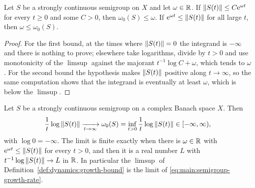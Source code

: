 \begin{lemma}
  \label{lem:dynamics:growth-bound-norm-bounds}
  \leanok
  Let $S $ be a strongly continuous semigroup on $X $ and let $\omega\in\mathbb{R} $.  If
  $\left\|S(t)\right\|\leq C\mathrm{e}^{\omega t} $ for every $t\geq0 $ and some $C>0 $, then
  $\omega_0(S)\leq\omega $.  If $\mathrm{e}^{\omega t}\leq\left\|S(t)\right\| $ for all large $t $, then
  $\omega\leq\omega_0(S) $.
\end{lemma}

\begin{proof}
  \leanok
  For the first bound, at the times where $\left\|S(t)\right\|=0 $ the integrand is $-\infty $ and
  there is nothing to prove; elsewhere take logarithms, divide by $t>0 $ and use
  monotonicity of the $\limsup $ against the majorant $t^{-1}\log C+\omega $, which tends
  to $\omega $.  For the second bound the hypothesis makes $\left\|S(t)\right\| $ positive along
  $t\to\infty $, so the same computation shows that the integrand is eventually at least
  $\omega $, which is below the $\limsup $.
\end{proof}

\begin{lemma}
  \label{lem:dynamics:growth-bound-limit}
  \leanok
  Let $S $ be a strongly continuous semigroup on a complex Banach space $X $.  Then
  \[
    \frac1t\log\left\|S(t)\right\|\xrightarrow[t\to\infty]{}\omega_0(S)
    =\inf_{t>0}\frac1t\log\left\|S(t)\right\|\in[-\infty,\infty),
  \]
  with $\log0=-\infty$.  The limit is finite exactly when there is $\omega\in\mathbb{R}$ with
  $\mathrm{e}^{\omega t}\leq\left\|S(t)\right\|$ for every $t>0$, and then it is a real number $L$ with
  $t^{-1}\log\left\|S(t)\right\|\to L$ in $\mathbb{R}$.  In particular the $\limsup$ of
  Definition~\ref{def:dynamics:growth-bound} is the limit of
  \eqref{eq:main:semigroup-growth-rate}.
\end{lemma}

